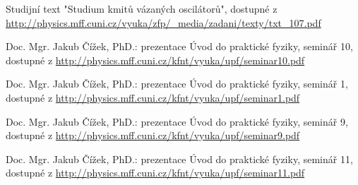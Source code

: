 \documentclass[protokol.tex]{subfiles}
\begin{document}
\begin{thebibliography}{}

Studijní text "Studium kmitů vázaných oscilátorů", dostupné z\\ \url{http://physics.mff.cuni.cz/vyuka/zfp/_media/zadani/texty/txt_107.pdf}

Doc. Mgr. Jakub Čížek, PhD.: prezentace Úvod do praktické fyziky, seminář 10, dostupné z \url{http://physics.mff.cuni.cz/kfnt/vyuka/upf/seminar10.pdf}

Doc. Mgr. Jakub Čížek, PhD.: prezentace Úvod do praktické fyziky, seminář 1, dostupné z \url{http://physics.mff.cuni.cz/kfnt/vyuka/upf/seminar1.pdf}

Doc. Mgr. Jakub Čížek, PhD.: prezentace Úvod do praktické fyziky, seminář 9, dostupné z \url{http://physics.mff.cuni.cz/kfnt/vyuka/upf/seminar9.pdf}

Doc. Mgr. Jakub Čížek, PhD.: prezentace Úvod do praktické fyziky, seminář 11, dostupné z \url{http://physics.mff.cuni.cz/kfnt/vyuka/upf/seminar11.pdf}

\end{thebibliography}
\end{document}
